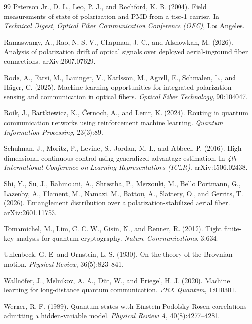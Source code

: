 \documentclass[12pt]{article}
\begin{document}
\begin{thebibliography}{99}
 Peterson Jr., D. L., Leo, P. J., and Rochford, K. B. (2004). Field
measurements of state of polarization and PMD from a tier-1 carrier. In
\emph{Technical Digest, Optical Fiber Communication Conference (OFC)}, Los
Angeles.

 Ramaswamy, A., Rao, N. S. V., Chapman, J. C., and Alshowkan, M.
(2026). Analysis of polarization drift of optical signals over deployed
aerial-inground fiber connections. arXiv:2607.07629.

 Rode, A., Farsi, M., Lauinger, V., Karlsson, M., Agrell, E., Schmalen,
L., and Häger, C. (2025). Machine learning opportunities for integrated
polarization sensing and communication in optical fibers. \emph{Optical Fiber
Technology}, 90:104047.

 Roik, J., Bartkiewicz, K., Černoch, A., and Lemr, K. (2024). Routing
in quantum communication networks using reinforcement machine learning.
\emph{Quantum Information Processing}, 23(3):89.

 Schulman, J., Moritz, P., Levine, S., Jordan, M. I., and Abbeel, P.
(2016). High-dimensional continuous control using generalized advantage
estimation. In \emph{4th International Conference on Learning Representations
(ICLR)}. arXiv:1506.02438.

 Shi, Y., Su, J., Rahmouni, A., Shrestha, P., Merzouki, M., Bello
Portmann, G., Lazenby, A., Flament, M., Namazi, M., Battou, A., Slattery, O.,
and Gerrits, T. (2026). Entanglement distribution over a polarization-stabilized
aerial fiber. arXiv:2601.11753.

 Tomamichel, M., Lim, C. C. W., Gisin, N., and Renner, R. (2012). Tight
finite-key analysis for quantum cryptography. \emph{Nature Communications},
3:634.

 Uhlenbeck, G. E. and Ornstein, L. S. (1930). On the theory of the
Brownian motion. \emph{Physical Review}, 36(5):823--841.

 Wallnöfer, J., Melnikov, A. A., Dür, W., and Briegel, H. J. (2020).
Machine learning for long-distance quantum communication. \emph{PRX Quantum},
1:010301.

 Werner, R. F. (1989). Quantum states with Einstein-Podolsky-Rosen
correlations admitting a hidden-variable model. \emph{Physical Review A},
40(8):4277--4281.


\end{thebibliography}
\end{document}
